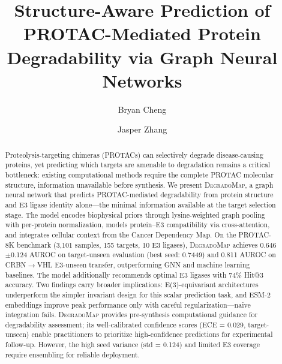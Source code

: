 \documentclass[sigconf]{acmart}
\newcommand{\ours}{\textsc{DegradoMap}}
\newcommand{\spm}[1]{{\scriptsize$\pm$#1}}
\begin{document}

\title{Structure-Aware Prediction of PROTAC-Mediated Protein Degradability via Graph Neural Networks}

\author{Bryan Cheng}

\author{Jasper Zhang}


\begin{abstract}
Proteolysis-targeting chimeras (PROTACs) can selectively degrade disease-causing proteins, yet predicting which targets are amenable to degradation remains a critical bottleneck: existing computational methods require the complete PROTAC molecular structure, information unavailable before synthesis.
We present \ours{}, a graph neural network that predicts PROTAC-mediated degradability from protein structure and E3 ligase identity alone---the minimal information available at the target selection stage.
The model encodes biophysical priors through lysine-weighted graph pooling with per-protein normalization, models protein--E3 compatibility via cross-attention, and integrates cellular context from the Cancer Dependency Map.
On the PROTAC-8K benchmark (3,101 samples, 155 targets, 10 E3 ligases), \ours{} achieves 0.646\,\spm{0.124} AUROC on target-unseen evaluation (best seed: 0.7449) and 0.811 AUROC on CRBN$\to$VHL E3-unseen transfer, outperforming GNN and machine learning baselines.
The model additionally recommends optimal E3 ligases with 74\% Hit@3 accuracy.
Two findings carry broader implications: E(3)-equivariant architectures underperform the simpler invariant design for this scalar prediction task, and ESM-2 embeddings improve peak performance only with careful regularization---naive integration fails.
\ours{} provides pre-synthesis computational guidance for degradability assessment; its well-calibrated confidence scores (ECE = 0.029, target-unseen) enable practitioners to prioritize high-confidence predictions for experimental follow-up. However, the high seed variance (std = 0.124) and limited E3 coverage require ensembling for reliable deployment.
\end{abstract}
\end{document}

